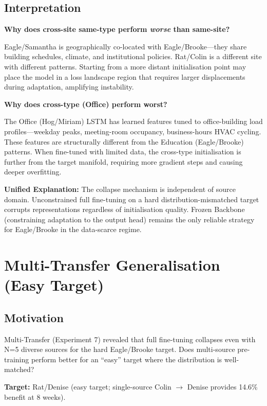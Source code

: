 \documentclass[12pt,a4paper]{report}
\begin{document}
\subsection{Interpretation}

\textbf{Why does cross-site same-type perform \textit{worse} than same-site?}

Eagle/Samantha is geographically co-located with Eagle/Brooke---they share building schedules, climate, and institutional policies. Rat/Colin is a different site with different patterns. Starting from a more distant initialisation point may place the model in a loss landscape region that requires larger displacements during adaptation, amplifying instability.

\textbf{Why does cross-type (Office) perform worst?}

The Office (Hog/Miriam) LSTM has learned features tuned to office-building load profiles---weekday peaks, meeting-room occupancy, business-hours HVAC cycling. These features are structurally different from the Education (Eagle/Brooke) patterns. When fine-tuned with limited data, the cross-type initialisation is further from the target manifold, requiring more gradient steps and causing deeper overfitting.

\textbf{Unified Explanation:} The collapse mechanism is independent of source domain. Unconstrained full fine-tuning on a hard distribution-mismatched target corrupts representations regardless of initialisation quality. Frozen Backbone (constraining adaptation to the output head) remains the only reliable strategy for Eagle/Brooke in the data-scarce regime.

\section{Multi-Transfer Generalisation (Easy Target)}

\subsection{Motivation}

Multi-Transfer (Experiment 7) revealed that full fine-tuning collapses even with N=5 diverse sources for the hard Eagle/Brooke target. Does multi-source pre-training perform better for an ``easy'' target where the distribution is well-matched?

\textbf{Target:} Rat/Denise (easy target; single-source Colin $\to$ Denise provides 14.6\% benefit at 8 weeks).
\end{document}
